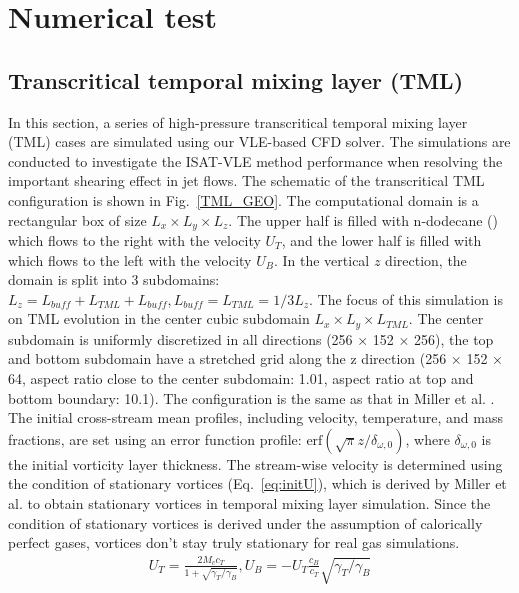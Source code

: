 \section{Numerical test}
\subsection{Transcritical temporal mixing layer (TML)}
\label{sec:TML}

In this section, a series of high-pressure transcritical temporal mixing layer (TML) cases are simulated using our VLE-based CFD solver. The simulations are conducted to investigate the ISAT-VLE method performance when resolving the important shearing effect in jet flows. The schematic of the transcritical TML configuration is shown in Fig.~\ref{TML_GEO}. The computational domain is a rectangular box of size $L_x \times L_y \times L_z$.
The upper half is filled with n-dodecane () which flows to the right with the velocity $U_T$, and the lower half is filled with  which flows to the left with the velocity $U_B$. In the vertical $z$ direction, the domain is split into 3 subdomains: $L_z = L_{buff}+L_{TML}+L_{buff}, L_{buff} = L_{TML} = 1/3 L_z$. The focus of this simulation is on TML evolution in the center cubic subdomain $L_x \times L_y \times L_{TML}$. The center subdomain is uniformly discretized in all directions (256 × 152 × 256), the top and bottom subdomain have a stretched grid along the z direction (256 × 152 × 64, aspect ratio close to the center subdomain: 1.01, aspect ratio at top and bottom boundary: 10.1). The configuration is the same as that in Miller et al. \cite{miller2001direct}. The initial cross-stream mean profiles, including velocity, temperature, and mass fractions, are set using an error function profile: $\textrm{erf}(\sqrt{\pi}z/\delta_{\omega,0})$, where $\delta_{\omega,0}$ is the initial vorticity layer thickness. The stream-wise velocity is determined using the condition of stationary vortices (Eq.~\ref{eq:initU}), which is derived by Miller et al. \cite{miller2001direct} to obtain stationary vortices in temporal mixing layer simulation. Since the condition of stationary vortices is derived under the assumption of calorically perfect gases, vortices don't stay truly stationary for real gas simulations.
\begin{align} U_T = \frac{2M_c c_T}{1+\sqrt{\gamma_T/\gamma_B}},U_B = -U_T \frac{c_B}{c_T}\sqrt{\gamma_T/\gamma_B} \label{eq:initU} \end{align}


